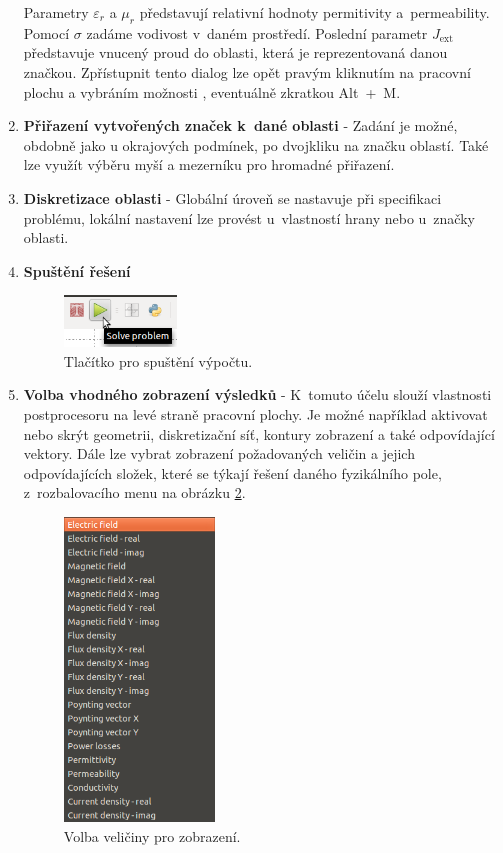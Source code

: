 \begin{enumerate}
Parametry $\varepsilon_r$ a $\mu_r$ představují relativní hodnoty permitivity a~permeability. Pomocí $\sigma$ zadáme vodivost v~daném prostředí. Poslední parametr $J_{\mathrm{ext}}$ představuje vnucený proud do oblasti, která je reprezentovaná danou značkou. Zpřístupnit tento dialog lze opět pravým kliknutím na pracovní plochu a vybráním možnosti , eventuálně zkratkou \mbox{Alt + M}. 
\item {\bf Přiřazení vytvořených značek k~dané oblasti} - Zadání je možné, obdobně jako u okrajových podmínek, po dvojkliku na značku oblastí. Také lze využít výběru myší a mezerníku pro hromadné přiřazení.
\item {\bf Diskretizace oblasti} - Globální úroveň se nastavuje při specifikaci problému, lokální nastavení lze provést u~vlastností hrany nebo u~značky oblasti.
\item {\bf Spuštění řešení}
\begin{figure}[!h]
	\centering
	\includegraphics[width=3cm]{sim_spusteni_reseni.png}
	\caption{Tlačítko pro spuštění výpočtu.}
	\label{obr:sim_spusteni_reseni}
\end{figure}
\item {\bf Volba vhodného zobrazení výsledků} - K~tomuto účelu slouží vlastnosti postprocesoru na levé straně pracovní plochy. Je možné například aktivovat nebo skrýt geometrii, diskretizační síť, kontury zobrazení a také odpovídající vektory. Dále lze vybrat zobrazení požadovaných veličin a jejich odpovídajících složek, které se týkají řešení daného fyzikálního pole, z~rozbalovacího menu na obrázku \ref{obr:sim_zobrazeni}.
\begin{figure}[!h]
	\centering
	\includegraphics[width=4cm]{sim_zobrazeni.png}
	\caption{Volba veličiny pro zobrazení.}
	\label{obr:sim_zobrazeni}
\end{figure}
\end{enumerate}


